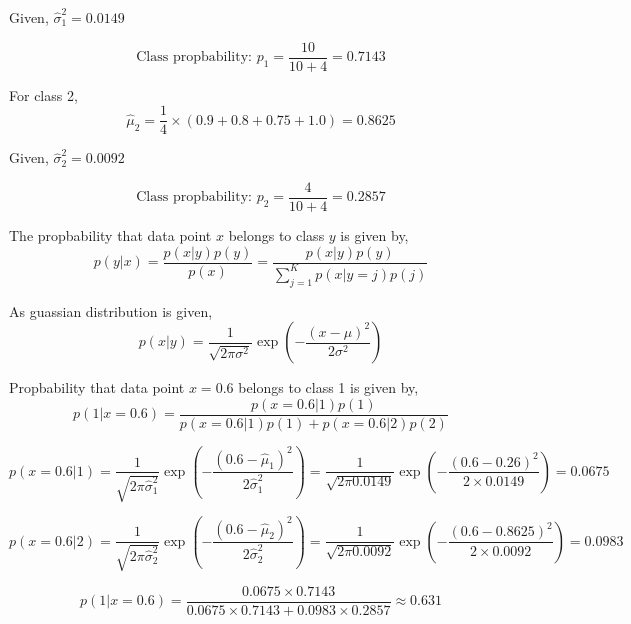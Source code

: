 \documentclass[12pt]{article}
\begin{document}
Given, $\hat {\sigma}^2_1 = 0.0149$

\begin{equation}
    \text{Class propbability: } 
    p_1 = \frac{10}{10 + 4} = 0.7143
    \nonumber
\end{equation}

For class 2,
\begin{equation}
    \hat{\mu}_2 = \frac{1}{4} \times (0.9 + 0.8 + 0.75 + 1.0) = 0.8625
    \nonumber
\end{equation}

Given, $\hat {\sigma}^2_2 = 0.0092$

\begin{equation}
    \text{Class propbability: } 
    p_2 = \frac{4}{10 + 4} = 0.2857
    \nonumber
\end{equation}

The propbability that data point $x$ belongs to class $y$ is given by,
\begin{equation}
    p(y|x) = \frac{p(x|y)p(y)}{p(x)} 
    = \frac{p(x|y)p(y)}{\sum_{j=1}^{K} p(x|y=j)p(j)}
\end{equation}

As guassian distribution is given,
\begin{equation}
    p(x|y) = \frac{1}{\sqrt{2\pi\sigma^2}} \exp\left(-\frac{(x-\mu)^2}{2\sigma^2}\right)
\end{equation}

Propbability that data point $x = 0.6$ belongs to class 1 is given by,
\begin{equation}
    p(1|x=0.6) = \frac{p(x=0.6|1)p(1)}{p(x=0.6|1)p(1) + p(x=0.6|2)p(2)}
\end{equation}

\begin{equation}
    p(x=0.6|1) = \frac{1}{\sqrt{2\pi\hat{\sigma}^2_1}} \exp\left(-\frac{(0.6-\hat{\mu}_1)^2}{2\hat{\sigma}^2_1}\right)
    = \frac{1}{\sqrt{2\pi0.0149}} \exp\left(-\frac{(0.6-0.26)^2}{2\times0.0149}\right)
    = 0.0675
    \nonumber
\end{equation}

\begin{equation}
    p(x=0.6|2) = \frac{1}{\sqrt{2\pi\hat{\sigma}^2_2}} \exp\left(-\frac{(0.6-\hat{\mu}_2)^2}{2\hat{\sigma}^2_2}\right)
    = \frac{1}{\sqrt{2\pi0.0092}} \exp\left(-\frac{(0.6-0.8625)^2}{2\times0.0092}\right)
    = 0.0983
    \nonumber
\end{equation}

\begin{equation}
    p(1|x=0.6) = \frac{0.0675 \times 0.7143}{0.0675 \times 0.7143 + 0.0983 \times 0.2857}
    \approx 0.631
    \nonumber
\end{equation}
\end{document}
